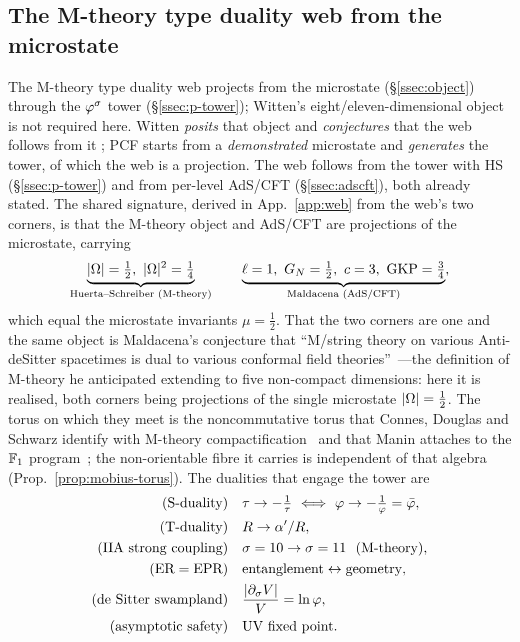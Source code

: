 \subsection{The M-theory type duality web from the microstate}\label{ssec:web}
The M-theory type duality web projects from the microstate (\S\ref{ssec:object}) through the
$\varphi^{\sigma}$ tower (\S\ref{ssec:p-tower}); Witten's eight/eleven-dimensional object is not
required here. Witten \emph{posits} that object and \emph{conjectures} that the web follows from it
\cite{Witten95}; PCF starts from a \emph{demonstrated} microstate and \emph{generates} the tower, of
which the web is a projection. The web follows from the tower with HS (\S\ref{ssec:p-tower}) and from
per-level AdS/CFT (\S\ref{ssec:adscft}), both already stated. The shared signature, derived in
App.~\ref{app:web} from the web's two corners, is that the M-theory object and AdS/CFT are
projections of the microstate, carrying
\begin{equation}\label{eq:shared-signature}
  \underbrace{|\Om|=\tfrac12,\ |\Om|^{2}=\tfrac14}_{\text{Huerta--Schreiber (M-theory)}}\qquad
  \underbrace{\ell=1,\ \GN=\tfrac12,\ c=3,\ \mathrm{GKP}=\tfrac34}_{\text{Maldacena (AdS/CFT)}} ,
\end{equation}
which equal the microstate invariants $\mu=\tfrac12$. That the two corners are one and the
same object is Maldacena's conjecture that ``M/string theory on various Anti-deSitter
spacetimes is dual to various conformal field theories''~\cite{Maldacena98}---the definition of
M-theory he anticipated extending to five non-compact dimensions: here it is realised, both corners being
projections of the single microstate $|\Omega|=\tfrac12$. The torus on which they meet is the
noncommutative torus that Connes, Douglas and Schwarz identify with M-theory
compactification~\cite{connes98} and that Manin attaches to the $\mathbb{F}_1$ program~\cite{manin04};
the non-orientable fibre it carries is independent of that algebra (Prop.~\ref{prop:mobius-torus}). The dualities that engage the tower are
\begin{align}
  \text{(S-duality)}\quad & \tau\to-\tfrac1\tau\ \Longleftrightarrow\ \golden\to-\tfrac1\golden
    =\bar\golden, \label{eq:bridge-S}\\
  \text{(T-duality)}\quad & R\to\alpha'/R, \label{eq:bridge-T}\\
  \text{(IIA strong coupling)}\quad & \sigma=10\to\sigma=11\ \ (\text{M-theory}), \label{eq:bridge-Witten}\\
  \text{(ER}=\text{EPR)}\quad & \text{entanglement}\leftrightarrow\text{geometry}, \label{eq:bridge-ER}\\
  \text{(de Sitter swampland)}\quad & \frac{|\partial_{\sigma}V|}{V}=\ln\golden, \label{eq:dS-swampland}\\
  \text{(asymptotic safety)}\quad & \text{UV fixed point}. \label{eq:bridge-fixed}
\end{align}

